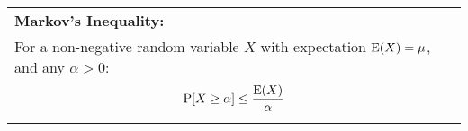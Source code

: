 {\tabulinesep=1mm
\begin{tabu}{|p{16cm} |}
\hline
\textbf{Markov's Inequality:} \\
For a non-negative random variable $X$ with expectation $\text{E}(X) = \mu$, 
and any  $\alpha > 0$:
\[\text{P}[X \geq \alpha] \leq \frac{\text{E}(X)}{\alpha}\]
\\
\hline
\end{tabu}
}

\begin{comment}
\textbf{Proof of Markov's Inequality}\newline
\[E(X) = \sum_a a * Pr[X = a] \]
\[\geq \sum_{a \geq \alpha} a *  Pr[X = a] \]
\[\geq \alpha \sum_{a \geq \alpha} Pr[X = a] \]
\[= \alpha Pr[X \geq \alpha]\]

\textbf{Alternate Proof of Markov's Inequality} \newline
Consider the indicator random variable $Y$ which equals $1$ if $X \geq a$ and $0$ otherwise. \newline
Now consider the relationship between $X$ and $aY$ \newline
\begin{itemize}
	\item If $X < a$, then $Y = 0$, which means $aY = a * 0 = 0$ \newline
	Because $X$ is a non-negative random variable, $X \geq 0$, so $aY \leq X$ in this case. 
	\item If $X \geq a$, then $Y = 1$, which means $aY = a * 1 = a \leq X$ \newline
\end{itemize}
Thus, we have $aY \leq X$. \newline
We take expectation on both sides to get: 
\[E[aY] \leq X\]
\[aE[Y] \leq E[X]\]
\[E[Y] \leq \frac{E[X]}{a} \]
Now we note that the expectation of an indicator random variable is the probability that it is equal to $1$ and we have the proof:
\[P(X \geq a) \leq \frac{E[X]}{a} \]
\end{comment}
